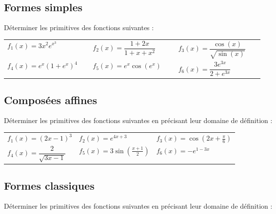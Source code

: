 \documentclass[oneside,12pt]{article}          %
\begin{document}
\subsection{Formes simples}
Déterminer les primitives des fonctions suivantes :

\renewcommand{\arraystretch}{2}
\begin{tabular}{p{0.3\linewidth} p{0.3\linewidth} p{0.3\linewidth}}
$f_1(x) = 3x^2 e^{x^3}$ & $f_2(x) = \dfrac{1 + 2x}{1 + x + x^2}$ & $f_3(x) = \dfrac{\cos(x)}{\sqrt{\sin(x)}}$ \\
$f_4(x) = e^x (1 + e^x)^4$ & $f_5(x) = e^x \cos(e^x)$ & $f_6(x) = \dfrac{3e^{3x}}{2 + e^{3x}}$
\end{tabular}



\subsection{Composées affines}
  Déterminer les primitives des fonctions suivantes en précisant leur domaine de définition :

\renewcommand{\arraystretch}{1.4}
\begin{tabular}{ p{} p{} p{} }

    $f_{1}(x)=(2x-1)^{3}$ & $f_{2}(x)=e^{4x+3}$ & $f_{3}(x)=\cos{(2x+\frac{\pi}{6})}$ \\
    
    $f_{4}(x)=\dfrac{2}{\sqrt{3x-1}}$ & $f_{5}(x)=3\sin{\left(\frac{x+1}{2}\right)}$ & $f_{6}(x)=-e^{1-3x}$ \\
\end{tabular}



\subsection{Formes classiques}
  Déterminer les primitives des fonctions suivantes en précisant leur domaine de définition : 
\end{document}
